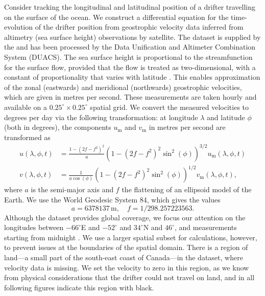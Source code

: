 Consider tracking the longitudinal and latitudinal position of a drifter travelling on the surface of the ocean.
We construct a differential equation for the time-evolution of the drifter position from geostrophic velocity data inferred from altimetry (sea surface height) observations by satellite.
The dataset is supplied by the \citet{E.U.CopernicusMarineServiceCMEMS_2020_GlobalOceanGridded} and has been processed by the Data Unification and Altimeter Combination System (DUACS).
The sea surface height is proportional to the streamfunction for the surface flow, provided that the flow is treated as two-dimensional, with a constant of proportionality that varies with latitude \citep{Park_2004_DeterminationSurfaceGeostrophic,DoglioniEtAl_2021_SeaSurfaceHeight}.
This enables approximation of the zonal (eastwards) and meridional (northwards) geostrophic velocities, which are given in metres per second.
These measurements are taken hourly and available on a \(0.25^\circ \times 0.25^\circ\) spatial grid.
We convert the measured velocities to degrees per day via the following transformation: at longitude \(\lambda\) and latitude \(\phi\) (both in degrees), the components \(u_{\mathrm{m}}\) and \(v_{\mathrm{m}}\) in metres per second are transformed as \citep{Capderou_2014_HandbookSatelliteOrbits}
\begin{subequations}\label{eqn:natl_vel_conv}
	\begin{align}
		u\!\left(\lambda, \phi, t\right) & = \frac{1 - \left(2f - f^2\right)^2}{a}\left(1 - \left(2f - f^2\right)^2\sin^2\!\left(\phi\right)\right)^{3/2} u_{\mathrm{m}}\!\left(\lambda, \phi, t\right) \\
		v\!\left(\lambda, \phi, t\right) & = \frac{1}{a\cos\!\left(\phi\right)}\left(1 - \left(2f - f^2\right)^2\sin^2\!\left(\phi\right)\right)^{1/2} v_{\mathrm{m}}\!\left(\lambda, \phi, t\right),
	\end{align}
\end{subequations}
where \(a\) is the semi-major axis and \(f\) the flattening of an ellipsoid model of the Earth.
We use the World Geodesic System 84, which gives the values \citep{Capderou_2014_HandbookSatelliteOrbits}
\[
	a = 6378137\,\unit{\metre}, \quad f = 1 / 298.257223563.
\]
Although the dataset provides global coverage, we focus our attention on the longitudes between \(-66^\circ\)E and \(-52^\circ\) and \(34^\circ\)N and \(46^\circ\), and measurements starting from midnight .
We use a larger spatial subset for calculations, however, to prevent issues at the boundaries of the spatial domain.
There is a region of land---a small part of the south-east coast of Canada---in the dataset, where velocity data is missing.
We set the velocity to zero in this region, as we know from physical considerations that the drifter could not travel on land, and in all following figures indicate this region with black.

